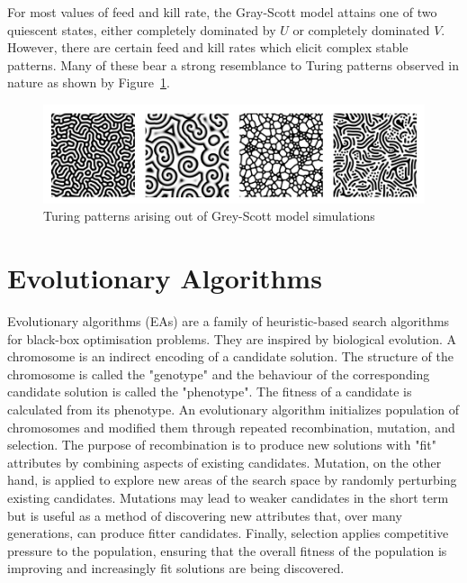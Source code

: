 For most values of feed and kill rate, the Gray-Scott model attains one of two quiescent states, either completely dominated by $U$ or completely dominated $V$. However, there are certain feed and kill rates which elicit complex stable patterns. Many of these bear a strong resemblance to Turing patterns observed in nature as shown by Figure~\ref{fig:gs-turing-patterns}.

\begin{figure}[H]
\centering
\includegraphics[width=\textwidth]{images/turing-patterns.png}
\caption{Turing patterns arising out of Grey-Scott model simulations\cite{sims}}
\label{fig:gs-turing-patterns}
\end{figure}

\section{Evolutionary Algorithms}

Evolutionary algorithms (EAs) are a family of heuristic-based search algorithms for black-box optimisation problems. They are inspired by biological evolution. A chromosome is an indirect encoding of a candidate solution. The structure of the chromosome is called the "genotype" and the behaviour of the corresponding candidate solution is called the "phenotype". The fitness of a candidate is calculated from its phenotype. An evolutionary algorithm initializes population of chromosomes and modified them through repeated recombination, mutation, and selection. The purpose of recombination is to produce new solutions with "fit" attributes by combining aspects of existing candidates. Mutation, on the other hand, is applied to explore new areas of the search space by randomly perturbing existing candidates. Mutations may lead to weaker candidates in the short term but is useful as a method of discovering new attributes that, over many generations, can produce fitter candidates. Finally, selection applies competitive pressure to the population, ensuring that the overall fitness of the population is improving and increasingly fit solutions are being discovered.\\

